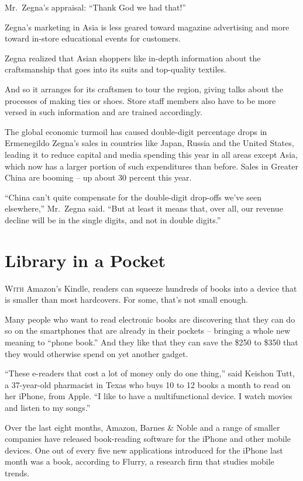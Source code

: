 ﻿\documentclass[12pt]{article}
\begin{document}
Mr.~Zegna's appraisal: ``Thank God we had that!''

Zegna's marketing in Asia is less geared toward magazine advertising and more toward in-store
educational events for customers.

Zegna realized that Asian shoppers like in-depth information about the craftsmanship that goes into
its suits and top-quality textiles.

And so it arranges for its craftsmen to tour the region, giving talks about the processes of making
ties or shoes. Store staff members also have to be more versed in such information and are trained
accordingly.

The global economic turmoil has caused double-digit percentage drops in Ermenegildo Zegna's sales in
countries like Japan, Russia and the United States, leading it to reduce capital and media spending
this year in all areas except Asia, which now has a larger portion of such expenditures than before.
Sales in Greater China are booming -- up about 30 percent this year.

``China can't quite compensate for the double-digit drop-offs we've seen elsewhere,'' Mr.~Zegna
said. ``But at least it means that, over all, our revenue decline will be in the single digits, and
not in double digits.''

\section{Library in a Pocket}

\lettrine{W}{ith} Amazon's Kindle, readers can squeeze hundreds of books
into a device that is smaller than most hardcovers. For some, that's not small enough.

Many people who want to read electronic books are discovering that they can do so on the smartphones
that are already in their pockets -- bringing a whole new meaning to ``phone book.'' And they like
that they can save the \$250 to \$350 that they would otherwise spend on yet another gadget.

``These e-readers that cost a lot of money only do one thing,'' said Keishon Tutt, a 37-year-old
pharmacist in Texas who buys 10 to 12 books a month to read on her iPhone, from Apple. ``I like to
have a multifunctional device. I watch movies and listen to my songs.''

Over the last eight months, Amazon, Barnes \& Noble and a range of smaller companies have released
book-reading software for the iPhone and other mobile devices. One out of every five new
applications introduced for the iPhone last month was a book, according to Flurry, a research firm
that studies mobile trends.
\end{document}
